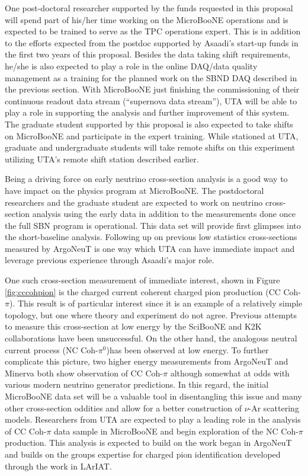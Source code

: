 One post-doctoral researcher supported by the funds requested in this proposal will spend part of his/her time working on the MicroBooNE operations and is expected to be trained to serve as the TPC operations expert. This is in addition to the efforts expected from the postdoc supported by Asaadi's start-up funds in the first two years of this proposal.  Besides the data taking shift requirements, he/she is also expected to play a role in the online DAQ/data quality management as a training for the planned work on the SBND DAQ described in the previous section. With MicroBooNE just finishing the commissioning of their continuous readout data stream (``supernova data stream''), UTA will be able to play a role in supporting the analysis and further improvement of this system. The graduate student supported by this proposal is also expected to take shifts on MicroBooNE and participate in the expert training. While stationed at UTA, graduate and undergraduate students will take remote shifts on this experiment utilizing UTA's remote shift station described earlier. 


\label{sec:UbooneDataAnalysis}
Being a driving force on early neutrino cross-section analysis is a good way to have impact on the physics program at MicroBooNE. The postdoctoral researchers and the graduate student are expected to work on neutrino cross-section analysis using the early data in addition to the measurements done once the full SBN program is operational. This data set will provide first glimpses into the short-baseline analysis. Following up on previous low statistics cross-sections measured by ArgoNeuT is one way which UTA can have immediate impact and leverage previous experience through Asaadi's major role. 

One such cross-section measurement of immediate interest, shown in Figure \ref{fig:cccohpion} is the charged current coherent charged pion production (CC Coh-$\pi$). This result is of particular interest since it is an example of a relatively simple topology, but one where theory and experiment do not agree. Previous attempts to measure this cross-section at low energy by the SciBooNE and K2K collaborations have been unsuccessful. On the other hand, the analogous neutral current process (NC Coh-$\pi^{0}$)has been observed at low energy. To further complicate this picture, two higher energy measurements from ArgoNeuT and Minerva both show observation of CC Coh-$\pi$ although somewhat at odds with various modern neutrino generator predictions. In this regard, the initial MicroBooNE data set will be a valuable tool in disentangling this issue and many other cross-section oddities and allow for a better construction of $\nu$-Ar scattering models. Researchers from UTA are expected to play a leading role in the analysis of CC Coh-$\pi$ data sample in MicroBooNE and begin exploration of the NC Coh-$\pi$ production. This analysis is expected to build on the work began in ArgoNeuT \cite{Argoneut} and builds on the groups expertise for charged pion identification developed through the work in LArIAT.
 
